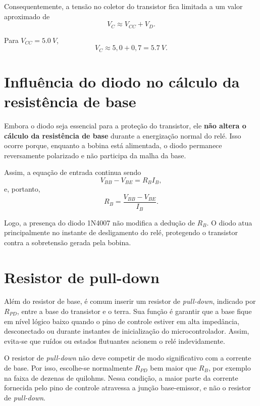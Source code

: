 \documentclass[12pt,a4paper]{article}
\newcommand{\Vcc}{V_{CC}}
\newcommand{\Vbb}{V_{BB}}
\newcommand{\Vbe}{V_{BE}}
\newcommand{\Ib}{I_B}
\newcommand{\Rb}{R_B}
\newcommand{\Rpd}{R_{PD}}
\begin{document}
Consequentemente, a tensão no coletor do transistor fica limitada a um valor aproximado de
\begin{equation}
V_C \approx \Vcc + V_D.
\end{equation}

Para $\Vcc = \SI{5,0}{V}$,
\begin{equation}
V_C \approx 5,0 + 0,7 = \SI{5,7}{V}.
\end{equation}

\section{Influência do diodo no cálculo da resistência de base}

Embora o diodo seja essencial para a proteção do transistor, ele \textbf{não altera o cálculo da resistência de base} durante a energização normal do relé. Isso ocorre porque, enquanto a bobina está alimentada, o diodo permanece reversamente polarizado e não participa da malha da base.

Assim, a equação de entrada continua sendo
\begin{equation}
\Vbb - \Vbe = \Rb\Ib,
\end{equation}
e, portanto,
\begin{equation}
\Rb = \frac{\Vbb - \Vbe}{\Ib}.
\end{equation}

Logo, a presença do diodo 1N4007 não modifica a dedução de $\Rb$. O diodo atua principalmente no instante de desligamento do relé, protegendo o transistor contra a sobretensão gerada pela bobina.

\section{Resistor de pull-down}

Além do resistor de base, é comum inserir um resistor de \emph{pull-down}, indicado por $\Rpd$, entre a base do transistor e o terra. Sua função é garantir que a base fique em nível lógico baixo quando o pino de controle estiver em alta impedância, desconectado ou durante instantes de inicialização do microcontrolador. Assim, evita-se que ruídos ou estados flutuantes acionem o relé indevidamente.

O resistor de \emph{pull-down} não deve competir de modo significativo com a corrente de base. Por isso, escolhe-se normalmente $\Rpd$ bem maior que $\Rb$, por exemplo na faixa de dezenas de quilohms. Nessa condição, a maior parte da corrente fornecida pelo pino de controle atravessa a junção base-emissor, e não o resistor de \emph{pull-down}.
\end{document}
